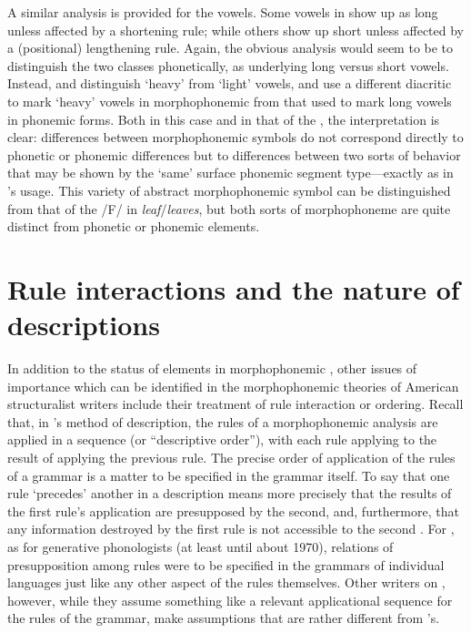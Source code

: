 A similar analysis is provided for the vowels. Some vowels in
 show up as long unless affected by a shortening rule;
while others show up short unless affected by a (positional)
lengthening rule. Again, the obvious analysis would seem to be to
distinguish the two classes phonetically, as underlying long versus
short vowels. Instead, {\Swadesh} and {\Voegelin} distinguish `heavy' from
`light' vowels, and use a different diacritic to mark `heavy' vowels
in morphophonemic  from that used to mark long vowels
in phonemic forms. Both in this case and in that of the ,
the interpretation is clear: differences between morphophonemic
symbols do not correspond directly to phonetic or phonemic differences
but to differences between two sorts of behavior that may be shown by
the `same' surface phonemic segment type—exactly as in {\Bloomfield}'s
usage. This variety of abstract morphophonemic symbol can be
distinguished from that of the /F/ in \emph{leaf}/\emph{leaves}, but
both sorts of morphophoneme are quite distinct from phonetic or
phonemic elements.

\section{Rule interactions and the nature of descriptions}
\label{sec.struct.interaction}
\largerpage
In addition to the status of elements in morphophonemic
, other issues of importance which can be identified in
the morphophonemic theories of American structuralist writers include
their treatment of rule interaction or ordering. Recall that, in
{\Bloomfield}'s method of description, the rules of a morphophonemic
analysis are applied in a sequence (or ``descriptive order''), with
each rule applying to the result of applying the previous
rule. The precise order of application of the rules of a grammar is a
matter to be specified in the grammar itself. To say that one rule
`precedes' another in a description means more precisely that the
results of the first rule's application are presupposed by the second,
and, furthermore, that any information destroyed by the first rule is
not accessible to the second \citep[see][]{sra03:iel2.ordering}. For
{\Bloomfield}, as for generative phonologists (at least until about
1970),  relations of presupposition among rules were to be
specified in the grammars of individual languages just like any other
aspect of the rules themselves. Other writers on ,
however, while they assume something like a relevant applicational
sequence for the rules of the grammar, make assumptions that are
rather different from {\Bloomfield}'s.

